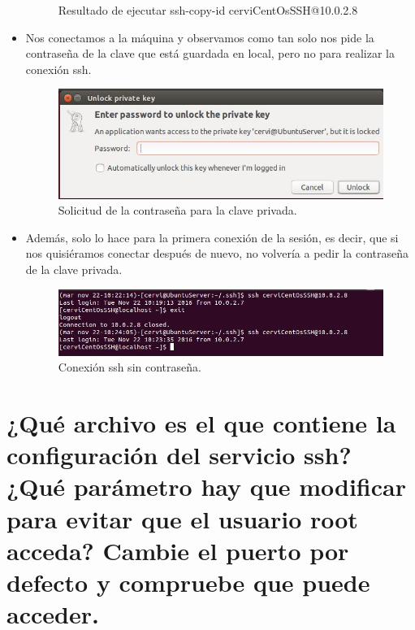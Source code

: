 \begin{itemize}
\begin{figure}[H]
		\caption{Resultado de ejecutar ssh-copy-id cerviCentOsSSH@10.0.2.8 \label{fig:figura13}}	\end{figure}
	\item Nos conectamos a la máquina y observamos como tan solo nos pide la contraseña de la clave
	que está guardada en local, pero no para realizar la conexión ssh.
	\begin{figure}[H]
		\centering
		\includegraphics[scale=0.75]{private-key-auth.jpg}
		\caption{Solicitud de la contraseña para la clave privada. \label{fig:figura14}}
	\end{figure}
	\item Además, solo lo hace para la primera conexión de la sesión, es decir, que si nos quisiéramos conectar después de nuevo, no volvería a pedir la contraseña de la clave privada.
	\begin{figure}[H]
		\centering
		\includegraphics[scale=0.75]{ssh-no-pass.jpg}
		\caption{Conexión ssh sin contraseña. \label{fig:figura15}}
	\end{figure}
\end{itemize}
\section{¿Qué archivo es el que contiene la configuración del servicio ssh? ¿Qué parámetro hay que modificar para evitar que el usuario root acceda? Cambie el puerto por defecto y compruebe que puede acceder.}

